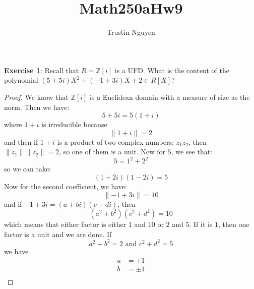 \documentclass{article}
\title{Math250aHw9}
\author{Trustin Nguyen}
\begin{document}
    \maketitle

\reversemarginpar

\textbf{Exercise 1}: Recall that $R = \mathbb{Z}[i]$ is a UFD. What is the content of the polynomial $(5 + 5i)X^{2} + (-1 + 3i)X + 2 \in R[X]$?
    \begin{proof}
        We know that $\mathbb{Z}[i]$ is a Euclidean domain with a measure of size as the norm. Then we have:
            \begin{equation*}
                5 + 5i =  5(1 + i)
            \end{equation*}
        where $1 + i$ is irreducible because 
            \begin{equation*}
                \lVert 1 + i \rVert = 2
            \end{equation*}
        and then if $1 + i$ is a product of two complex numbers: $z_{1}z_{2}$, then $\lVert z_{1} \rVert\lVert z_{2} \rVert = 2$, so one of them is a unit. Now for $5$, we see that:
            \begin{equation*}
                5 = 1^{2} + 2^{2}
            \end{equation*}
        so we can take:
            \begin{equation*}
                (1 + 2i)(1 - 2i) = 5
            \end{equation*}
        Now for the second coefficient, we have:
            \begin{equation*}
                \lVert -1 + 3i \rVert = 10
            \end{equation*}
        and if $-1 + 3i = (a + bi)(c + di)$, then 
            \begin{equation*}
                (a^{2}+ b^{2})(c^{2} + d^{2}) = 10
            \end{equation*}
        which means that either factor is either $1$ and $10$ or $2$ and $5$. If it is $1$, then one factor is a unit and we are done. If 
            \begin{equation*}
                a^{2} + b^{2} = 2 \text{ and } c^{2} + d^{2} = 5
            \end{equation*}
        we have
            \begin{align*}
                a &= \pm 1                   \\
                b &= \pm 1                   \\

\end{align*}
\end{proof}
\end{document}
